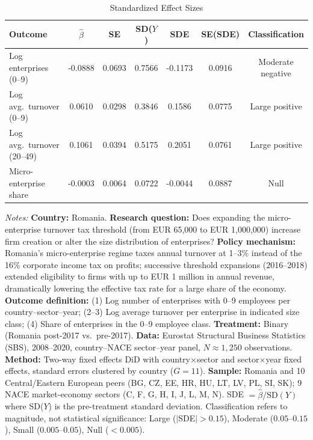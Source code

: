 \begin{table}[t]
\centering
\caption{Standardized Effect Sizes}
\label{tab:sde}
\small
\begin{tabular}{lcccccc}
\toprule
Outcome & $\hat{\beta}$ & SE & SD($Y$) & SDE & SE(SDE) & Classification \\
\midrule
Log enterprises (0--9) & -0.0888 & 0.0693 & 0.7566 & -0.1173 & 0.0916 & Moderate negative \\
Log avg.\ turnover (0--9) & 0.0610 & 0.0298 & 0.3846 & 0.1586 & 0.0775 & Large positive \\
Log avg.\ turnover (20--49) & 0.1061 & 0.0394 & 0.5175 & 0.2051 & 0.0761 & Large positive \\
Micro-enterprise share & -0.0003 & 0.0064 & 0.0722 & -0.0044 & 0.0887 & Null \\
\bottomrule
\end{tabular}
\begin{tablenotes}
\item \textit{Notes:} \textbf{Country:} Romania. \textbf{Research question:} Does expanding the micro-enterprise turnover tax threshold (from EUR 65,000 to EUR 1,000,000) increase firm creation or alter the size distribution of enterprises? \textbf{Policy mechanism:} Romania's micro-enterprise regime taxes annual turnover at 1--3\% instead of the 16\% corporate income tax on profits; successive threshold expansions (2016--2018) extended eligibility to firms with up to EUR 1 million in annual revenue, dramatically lowering the effective tax rate for a large share of the economy. \textbf{Outcome definition:} (1) Log number of enterprises with 0--9 employees per country--sector--year; (2--3) Log average turnover per enterprise in indicated size class; (4) Share of enterprises in the 0--9 employee class. \textbf{Treatment:} Binary (Romania post-2017 vs.\ pre-2017). \textbf{Data:} Eurostat Structural Business Statistics (SBS), 2008--2020, country--NACE sector--year panel, $N \approx 1{,}250$ observations. \textbf{Method:} Two-way fixed effects DiD with country$\times$sector and sector$\times$year fixed effects, standard errors clustered by country ($G = 11$). \textbf{Sample:} Romania and 10 Central/Eastern European peers (BG, CZ, EE, HR, HU, LT, LV, PL, SI, SK); 9 NACE market-economy sectors (C, F, G, H, I, J, L, M, N). SDE $= \hat{\beta} / \text{SD}(Y)$ where SD($Y$) is the pre-treatment standard deviation. Classification refers to magnitude, not statistical significance: Large ($|$SDE$| > 0.15$), Moderate ($0.05$--$0.15$), Small ($0.005$--$0.05$), Null ($< 0.005$).
\end{tablenotes}
\end{table}
